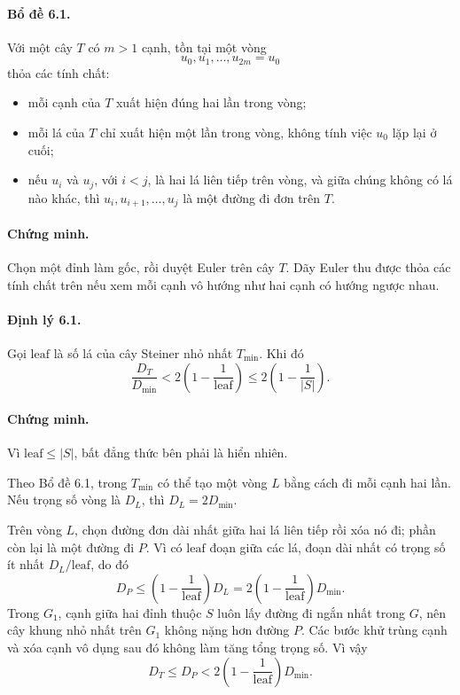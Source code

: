 \documentclass[11pt]{article}
\begin{document}
\paragraph{Bổ đề 6.1.}
Với một cây \(T\) có \(m>1\) cạnh, tồn tại một vòng
\[
  u_0,u_1,\ldots,u_{2m}=u_0
\]
thỏa các tính chất:
\begin{itemize}
  \item mỗi cạnh của \(T\) xuất hiện đúng hai lần trong vòng;
  \item mỗi lá của \(T\) chỉ xuất hiện một lần trong vòng, không tính việc
  \(u_0\) lặp lại ở cuối;
  \item nếu \(u_i\) và \(u_j\), với \(i<j\), là hai lá liên tiếp trên vòng, và
  giữa chúng không có lá nào khác, thì \(u_i,u_{i+1},\ldots,u_j\) là một đường
  đi đơn trên \(T\).
\end{itemize}

\paragraph{Chứng minh.}
Chọn một đỉnh làm gốc, rồi duyệt Euler trên cây \(T\). Dãy Euler thu được thỏa
các tính chất trên nếu xem mỗi cạnh vô hướng như hai cạnh có hướng ngược nhau.

\paragraph{Định lý 6.1.}
Gọi \(\mathrm{leaf}\) là số lá của cây Steiner nhỏ nhất \(T_{\min}\). Khi đó
\[
  \frac{D_T}{D_{\min}}
  < 2\left(1-\frac1{\mathrm{leaf}}\right)
  \le 2\left(1-\frac1{|S|}\right).
\]

\paragraph{Chứng minh.}
Vì \(\mathrm{leaf}\le |S|\), bất đẳng thức bên phải là hiển nhiên.

Theo Bổ đề 6.1, trong \(T_{\min}\) có thể tạo một vòng \(L\) bằng cách đi mỗi
cạnh hai lần. Nếu trọng số vòng là \(D_L\), thì \(D_L=2D_{\min}\).

Trên vòng \(L\), chọn đường đơn dài nhất giữa hai lá liên tiếp rồi xóa nó đi;
phần còn lại là một đường đi \(P\). Vì có \(\mathrm{leaf}\) đoạn giữa các lá,
đoạn dài nhất có trọng số ít nhất \(D_L/\mathrm{leaf}\), do đó
\[
  D_P\le \left(1-\frac1{\mathrm{leaf}}\right)D_L
  =2\left(1-\frac1{\mathrm{leaf}}\right)D_{\min}.
\]
Trong \(G_1\), cạnh giữa hai đỉnh thuộc \(S\) luôn lấy đường đi ngắn nhất trong
\(G\), nên cây khung nhỏ nhất trên \(G_1\) không nặng hơn đường \(P\). Các bước
khử trùng cạnh và xóa cạnh vô dụng sau đó không làm tăng tổng trọng số. Vì vậy
\[
  D_T\le D_P
  <2\left(1-\frac1{\mathrm{leaf}}\right)D_{\min}.
\]
\end{document}
